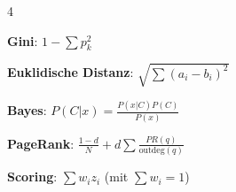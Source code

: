 \begin{landscape}
\begin{multicols*}{4}
\begin{cheatSheetBox}[title=Zentrale Formeln]
			\textbf{Gini}:
			$1 - \sum p_k^2$

			\textbf{Euklidische Distanz}:
			$\sqrt{\sum(a_i - b_i)^2}$

			\textbf{Bayes}:
			$P(C|x) = \frac{P(x|C)P(C)}{P(x)}$

			\textbf{PageRank}:
			$\frac{1-d}{N} + d\sum\frac{PR(q)}{\text{outdeg}(q)}$

			\textbf{Scoring}:
			$\sum w_i z_i$ (mit $\sum w_i=1$)
		\end{cheatSheetBox}

	\end{multicols*}
\end{landscape}
\clearpage
\restoregeometry